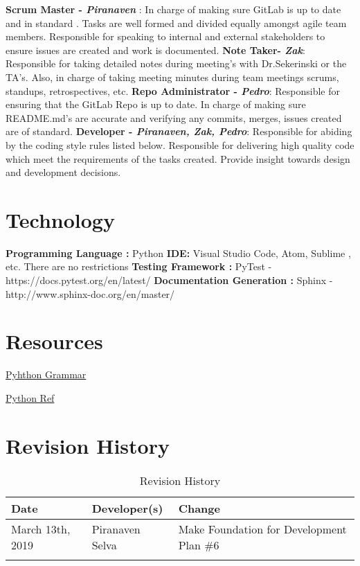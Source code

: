 \documentclass{article}
\begin{document}
\textbf{Scrum Master -\emph{ Piranaven }}: In charge of making sure GitLab is up to date and in standard . Tasks are well formed and divided equally amongst agile team members. Responsible for  speaking to internal and external stakeholders to ensure issues are created and work is documented. \newline
\textbf{Note Taker- \emph{Zak}}:  Responsible for taking detailed notes during meeting's with Dr.Sekerinski or the TA's. Also, in charge of taking meeting minutes during team meetings  scrums, standups, retrospectives, etc. \newline
\textbf{Repo Administrator - \emph{ Pedro}}:  Responsible for ensuring that the GitLab Repo is up to date. In charge of making sure README.md's are accurate and verifying any commits, merges, issues created are of standard.   \newline
\textbf{Developer - \emph{ Piranaven, Zak, Pedro}}: Responsible for abiding by the coding style rules listed below. Responsible for delivering high quality code which meet the requirements of the tasks created. Provide insight towards design and development decisions.  \newline




\section{Technology}

\textbf{Programming Language :} Python \newline
\textbf{IDE:}  Visual Studio Code, Atom, Sublime , etc. There are no restrictions\newline 
\textbf{Testing Framework :} PyTest  - https://docs.pytest.org/en/latest/ \newline
\textbf{Documentation Generation :} Sphinx - http://www.sphinx-doc.org/en/master/ \newline 



\section{Resources}
\href{run: ../../Resources/Full Grammar Specification — Python 3.7.3rc1 Documentation.html}{Pyhthon Grammar }

\href{https://www.python.org/dev/peps/pep-3103/}{Python Ref}


\newpage
\section{Revision History}
\begin{table}[hp]
\caption{Revision History} \label{TblRevisionHistory}
\begin{tabularx}{\textwidth}{llX}
\toprule
\textbf{Date} & \textbf{Developer(s)} & \textbf{Change}\\
\midrule
March 13th, 2019 &Piranaven Selva & Make Foundation for Development Plan \#6 \\
\\
\bottomrule
\end{tabularx}
\end{table}
\end{document}

